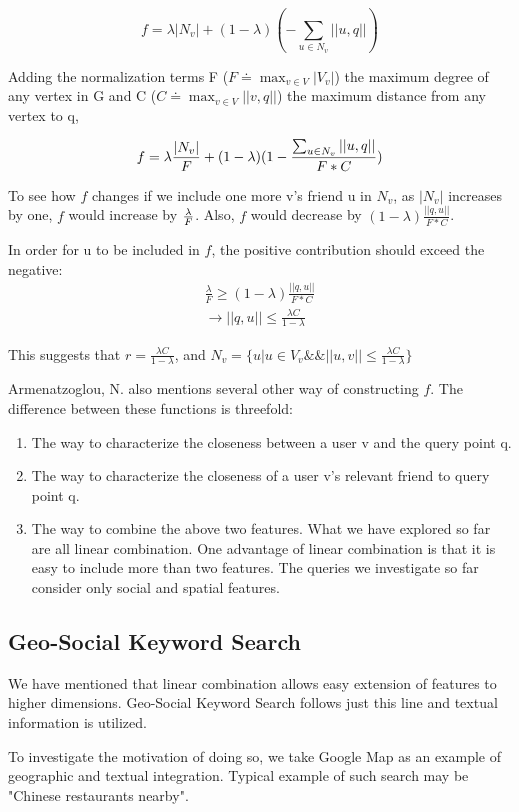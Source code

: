 \begin{equation}
f = \lambda |N_v| + (1 - \lambda) ( - \sum_{u \in N_v} ||u,q||)
\end{equation}

Adding the normalization terms F ($F \doteq \max_{v \in V} |V_v|$) the maximum degree of any vertex in G and C ($C \doteq \max_{v \in V} ||v,q||$) the maximum distance from any vertex to q,

\begin{equation}
f = \lambda {|N_v| \over F} + (1 - \lambda)(1 - \frac{\sum_{u \in N_v}||u,q||}{F*C})
\end{equation}

To see how $f$ changes if we include one more v's friend u in $N_v$, as $|N_v|$ increases by one, $f$ would increase by $\lambda \over F$. Also, $f$ would decrease by $(1 - \lambda) \frac{||q,u||}{F*C}$.

In order for u to be included in $f$, the positive contribution should exceed the negative:
\begin{align}
\frac{\lambda}{F} \ge (1 - \lambda) \frac{||q,u||}{F*C} \\
\longrightarrow ||q,u|| \le \frac{\lambda C}{1 - \lambda}
\end{align}

This suggests that $r = \frac{\lambda C}{1 - \lambda}$, and $N_v = \{ u | u \in V_v \& \& ||u,v|| \le \frac{\lambda C}{1 - \lambda} \}$

Armenatzoglou, N.\cite{Nikos} also mentions several other way of constructing $f$. The difference between these functions is threefold:
\begin{enumerate}
\item The way to characterize the closeness between a user v and the query point q.
\item The way to characterize the closeness of a user v's relevant friend to query point q.
\item The way to combine the above two features. What we have explored so far are all linear combination. One advantage of linear combination is that it is easy to include more than two features. The queries we investigate so far consider only social and spatial features.
\end{enumerate}

\subsection{Geo-Social Keyword Search}
We have mentioned that linear combination allows easy extension of features to higher dimensions. Geo-Social Keyword Search follows just this line and textual information is utilized. 

To investigate the motivation of doing so, we take Google Map as an example of geographic and textual integration. Typical example of such search may be "Chinese restaurants nearby". 
